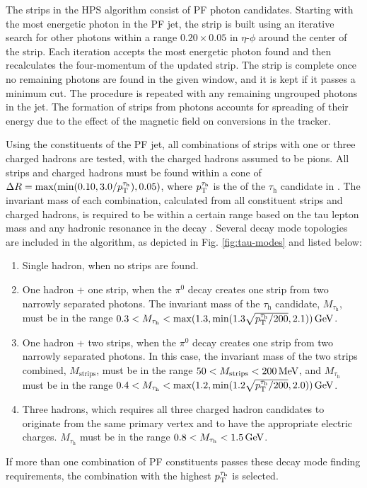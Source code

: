 \documentclass[12pt]{thesis}  %
\newcommand{\tauh}{\ensuremath{\tau_{\text{h}}}\xspace}
\begin{document}
The strips in the HPS algorithm consist of PF photon candidates. Starting with the most energetic photon in the PF jet, the strip is built using an iterative search for other photons within a range $0.20\times0.05$ in $\eta$-$\phi$ around the center of the strip. Each iteration accepts the most energetic photon found and then recalculates the four-momentum of the updated strip. The strip is complete once no remaining photons are found in the given window, and it is kept if it passes a minimum \pt cut. The procedure is repeated with any remaining ungrouped photons in the jet. The formation of strips from photons accounts for spreading of their energy due to the effect of the magnetic field on conversions in the tracker.

Using the constituents of the PF jet, all combinations of strips with one or three charged hadrons are tested, with the charged hadrons assumed to be pions. All strips and charged hadrons must be found within a cone of $\Delta R = \text{max}(\text{min}(0.10,3.0/\pt^{\tauh}),0.05)$, where $\pt^{\tauh}$ is the \pt of the \tauh candidate in \GeVns. The invariant mass of each combination, calculated from all constituent strips and charged hadrons, is required to be within a certain range based on the tau lepton mass and any hadronic resonance in the decay \cite{CMS-AN-2014-008}. Several decay mode topologies are included in the algorithm, as depicted in Fig. \ref{fig:tau-modes} and listed below:
\begin{enumerate}
\item Single hadron, when no strips are found.
\item One hadron + one strip, when the $\pi^0$ decay creates one strip from two narrowly separated photons. The invariant mass of the \tauh candidate, $M_{\tauh}$, must be in the range $0.3 < M_{\tauh} < \text{max}(1.3,\text{min}(1.3\sqrt{\pt^{\tauh}/200},2.1))\GeV$.
\item One hadron + two strips, when the $\pi^0$ decay creates one strip from two narrowly separated photons. In this case, the invariant mass of the two strips combined, $M_{\text{strips}}$, must be in the range $50 < M_{\text{strips}} < 200\,\text{Me\hspace{-.08em}V}$, and $M_{\tauh}$ must be in the range $0.4 < M_{\tauh} < \text{max}(1.2,\text{min}(1.2\sqrt{\pt^{\tauh}/200},2.0))\GeV$.
\item Three hadrons, which requires all three charged hadron candidates to originate from the same primary vertex and to have the appropriate electric charges. $M_{\tauh}$ must be in the range $0.8 < M_{\tauh} < 1.5\GeV$.
\end{enumerate}
If more than one combination of PF constituents passes these decay mode finding requirements, the combination with the highest $\pt^{\tauh}$ is selected.
\end{document}

